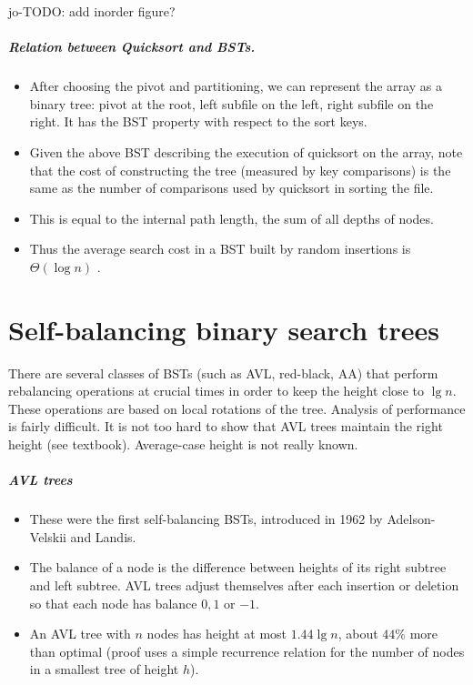 jo-TODO: add inorder figure?


\paragraph{Relation between Quicksort and BSTs.}
\begin{itemize}
\item After choosing the pivot and partitioning, we can represent the array as a 
binary tree: pivot at the root, left subfile on the left, right subfile on the 
right. It has the BST property with respect to the sort keys.
\item Given the above BST describing the execution of quicksort on the array, 
note that the cost of constructing the tree (measured by key comparisons) is 
the same as the number of comparisons used by quicksort in sorting the file.
\item This is equal to the \alert{internal path length}, the sum of all depths 
of nodes. 
\item Thus the average search cost in a BST built by random insertions is $\Theta(\log n)$ .
\end{itemize}






\chapter{Self-balancing binary search trees} %
\label{sec:balanced}

There are several classes of BSTs (such as AVL, red-black, AA) that 
perform rebalancing operations at crucial times in order to keep the height 
close to $\lg n$.
These operations are based on local \alert{rotations} of the tree.
Analysis of performance is fairly difficult.
It is not too hard to show that AVL trees maintain the right height (see textbook). 
Average-case height is not really known.

\paragraph{AVL trees}
\begin{itemize}
\item These were the first self-balancing BSTs, introduced in 1962 by 
Adelson-Velskii and Landis.
\item The \alert{balance of a node} is the difference between heights of its 
right subtree and left subtree. AVL trees adjust themselves after each insertion 
or deletion so that each node has balance $0, 1$ or $-1$.
\item An AVL tree with $n$ nodes has height at most $1.44 \lg n$, about $44\%$ more 
than optimal (proof uses a simple recurrence relation for the number of nodes in 
a smallest tree of height $h$).
\end{itemize}

